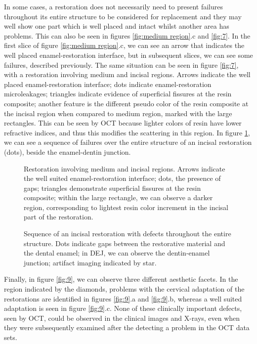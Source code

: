 \documentclass[12pt,twoside,english]{book}
\renewcommand{\~}{\perispomeni}%
\numberwithin{equation}{section}
\numberwithin{figure}{section}
\begin{document}
In some cases, a restoration does not necessarily need to present failures throughout its entire structure to be considered for replacement and they may well show one part which is well placed and intact whilst another area has problems. This can also be seen in figures \ref{fig:medium region}.c and \ref{fig:7}. In the first slice of figure \ref{fig:medium region}.c, we can see an arrow that indicates the well placed enamel-restoration interface, but in subsequent slices, we can see some failures, described previously. The same situation can be seen in figure \ref{fig:7}, with a restoration involving medium and incisal regions. Arrows indicate the well placed enamel-restoration interface; dots indicate enamel-restoration microleakages; triangles indicate evidence of superficial fissures at the resin composite; another feature is the different pseudo color of the resin composite at the incisal region when compared to medium region, marked with the large rectangles. This can be seen by OCT because lighter colors of resin have lower refractive indices, and thus this modifies the scattering in this region. In figure \ref{fig:8}, we can see a sequence of failures over the entire structure of an incisal restoration (dots), beside the enamel-dentin junction.
\begin{figure}[h]
\begin{minipage}[t]{0.54\textwidth}
\centering

\caption{Restoration involving medium and incisal regions. Arrows indicate the well suited enamel-restoration interface; dots, the presence of gaps; triangles demonstrate superficial fissures at the resin composite; within the large rectangle, we can observe a darker region, corresponding to lightest resin color increment in the incisal part of the restoration.}
\label{fig:7}
\end{minipage}
\hfill
\centering
\begin{minipage}[t]{0.44444\textwidth}

\caption{Sequence of an incisal restoration with defects throughout the entire structure. Dots indicate gaps between the restorative material and the dental enamel; in DEJ, we can observe the dentin-enamel junction; artifact imaging indicated by star.}
\label{fig:8}
\end{minipage}
\end{figure}
Finally, in figure \ref{fig:9}, we can observe three different aesthetic facets. In the region indicated by the diamonds, problems with the cervical adaptation of the restorations are identified in figures \ref{fig:9}.a and \ref{fig:9}.b, whereas a well suited adaptation is seen in figure \ref{fig:9}.c. None of these clinically important defects, seen by OCT, could be observed in the clinical images and X-rays, even when they were subsequently examined after the detecting a problem in the OCT data sets.
\end{document}
